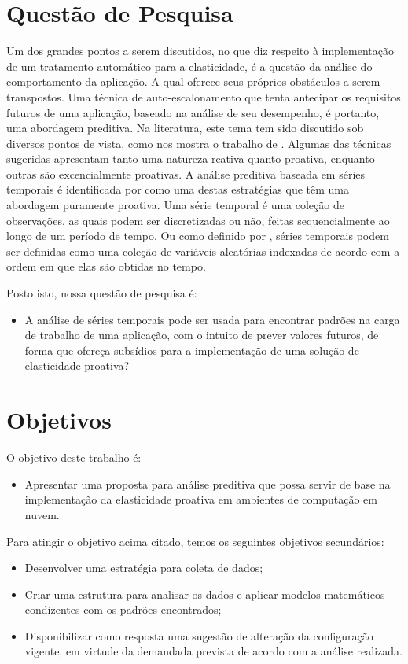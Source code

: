 \documentclass[twoside,english,brazilian]{UNISINOSmonografia}
\begin{document}
\section{Questão de Pesquisa}
Um dos grandes pontos a serem discutidos, no que diz respeito à implementação de um tratamento automático para a elasticidade, é a questão da análise do comportamento da aplicação. A qual oferece seus próprios obstáculos a serem transpostos. Uma técnica de auto-escalonamento que tenta antecipar os requisitos futuros de uma aplicação, baseado na análise de seu desempenho, é portanto, uma abordagem preditiva. Na literatura, este tema tem sido discutido sob diversos pontos de vista, como nos mostra o trabalho de \cite{Lorido-botr2012}. Algumas das técnicas sugeridas apresentam tanto uma natureza reativa quanto proativa, enquanto outras são excencialmente proativas. A análise preditiva baseada em séries temporais é identificada por \cite{Lorido-botr2012} como uma destas estratégias que têm uma abordagem puramente proativa. Uma série temporal é uma coleção de observações, as quais podem ser discretizadas ou não, feitas sequencialmente ao longo de um período de tempo. Ou como definido por \cite{Shumway2000}, séries temporais podem ser definidas como uma coleção de variáveis aleatórias indexadas de acordo com a ordem em que elas são obtidas no tempo. 

Posto isto, nossa questão de pesquisa é:
\begin{itemize}
	\item A análise de séries temporais pode ser usada para encontrar padrões na carga de trabalho de uma aplicação, com o intuito de prever valores futuros, de forma que ofereça subsídios para a implementação de uma solução de elasticidade proativa?
\end{itemize}

\section{Objetivos}
O objetivo deste trabalho é:

\begin{itemize}
	\item Apresentar uma proposta para análise preditiva que possa servir de base na implementação da elasticidade proativa em ambientes de computação em nuvem.
\end{itemize}

Para atingir o objetivo acima citado, temos os seguintes objetivos secundários:
\begin{itemize}
	\item Desenvolver uma estratégia para coleta de dados;
	\item Criar uma estrutura para analisar os dados e aplicar modelos matemáticos condizentes com os padrões encontrados;
	\item Disponibilizar como resposta uma sugestão de alteração da configuração vigente, em virtude da demandada prevista de acordo com a análise realizada. 
\end{itemize}
\end{document}
